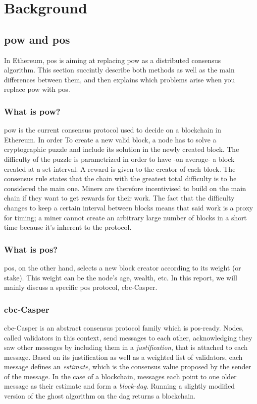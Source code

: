 \chapter{Background}
\label{chap:background}

\section{\gls{pow} and \gls{pos}}
In Ethereum, \gls{pos} is aiming at replacing \gls{pow} as a distributed
consensus algorithm. This section succintly describe both methods as well as the
main differences between them, and then explains which problems arise when you
replace \gls{pow} with \gls{pos}.

\subsection{What is \gls{pow}?}
\gls{pow} is the current consensus protocol used to decide on a blockchain in
Ethereum. In order To create a new valid block, a node has to solve a
cryptographic puzzle and include its solution in the newly created block. The
difficulty of the puzzle is parametrized in order to have -on average- a block
created at a set interval. A reward is given to the creator of each block.  The
consensus rule states that the chain with the greatest total difficulty is to be
considered the main one. Miners are therefore incentivised to build on the main
chain if they want to get rewards for their work. The fact that the difficulty
changes to keep a certain interval between blocks means that said work is a
proxy for timing; a miner cannot create an arbitrary large number of blocks in a
short time because it's inherent to the protocol.


\subsection{What is \gls{pos}?}
\gls{pos}, on the other hand, selects a new block creator according to its
weight (or stake). This weight can be the node's age, wealth, etc. In this
report, we will mainly discuss a specific \gls{pos} protocol, \gls{cbc}-Casper.

\subsection{\gls{cbc}-Casper}
\gls{cbc}-Casper  is an abstract consensus protocol family
which is \gls{pos}-ready. Nodes, called validators in this context, send
messages to each other, acknowledging they saw other messages by including them
in a \textit{justification}, that is attached to each message. Based on its
justification as well as a weighted list of validators, each message defines an
\textit{estimate}, which is the consensus value proposed by the sender of the
message. In the case of a blockchain, messages each point to one older message
as their estimate and form a \textit{block-\gls{dag}}. Running a slightly
modified version of the \gls{ghost} algorithm on the \gls{dag} returns a
blockchain.


